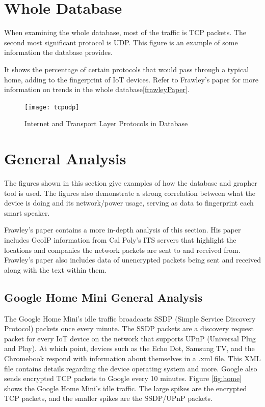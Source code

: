 \section{Whole Database}
\label{wholeDB}
When examining the whole database, most of the traffic is TCP packets. The second most significant protocol is UDP. This figure is an example of some information the database provides.

It shows the percentage of certain protocols that would pass through a typical home, adding to the fingerprint of IoT devices. Refer to Frawley's paper for more information on trends in the whole database\ref{frawleyPaper}.

\label{Whole Database}
\begin{figure}[H]
  \centering
    \texttt{[image: tcpudp]}
  \caption{Internet and Transport Layer Protocols in Database}
  \label{fig:tcpudp}
\end{figure}

\section{General Analysis}
\label{General Analysis}
The figures shown in this section give examples of how the database and grapher tool is used. The figures also demonstrate a strong correlation between what the device is doing and its network/power usage, serving as data to fingerprint each smart speaker.

Frawley's paper contains a more in-depth analysis of this section. His paper includes GeoIP \cite{maxmind} information from Cal Poly's ITS servers \cite{its} that highlight the locations and companies the network packets are sent to and received from. Frawley's paper also includes data of unencrypted packets being sent and received along with the text within them.

\subsection{Google Home Mini General Analysis}
The Google Home Mini's idle traffic broadcasts SSDP (Simple Service Discovery Protocol) packets once every minute. The SSDP packets are a discovery request packet for every IoT device on the network that supports UPnP (Universal Plug and Play). At which point, devices such as the Echo Dot, Samsung TV, and the Chromebook respond with information about themselves in a .xml file. This XML file contains details regarding the device operating system and more. Google also sends encrypted TCP packets to Google every 10 minutes. Figure \ref{fig:home} shows the Google Home Mini's idle traffic. The large spikes are the encrypted TCP packets, and the smaller spikes are the SSDP/UPnP packets.

